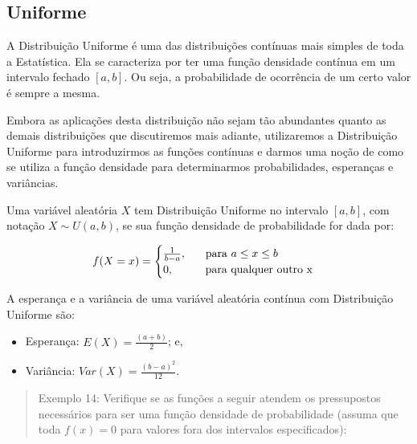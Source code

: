 \documentclass[
]{book}
\providecommand{\tightlist}{%
  \setlength{\itemsep}{0pt}\setlength{\parskip}{0pt}}
\begin{document}
\hypertarget{uniforme}{%
\subsection{Uniforme}\label{uniforme}}

\hfill\break

A Distribuição Uniforme é uma das distribuições contínuas mais simples de toda a Estatística. Ela se caracteriza por ter uma função densidade contínua em um intervalo fechado \([a,b]\). Ou seja, a probabilidade de ocorrência de um certo valor é sempre a mesma.

\hfill\break

Embora as aplicações desta distribuição não sejam tão abundantes quanto as demais distribuições que discutiremos mais adiante, utilizaremos a Distribuição Uniforme para introduzirmos as funções contínuas e darmos uma noção de como se utiliza a função densidade para determinarmos probabilidades, esperanças e variâncias.

\hfill\break

Uma variável aleatória \(X\) tem Distribuição Uniforme no intervalo \([a,b]\), com notação \(X \sim U (a, b)\), se sua função densidade de probabilidade for dada por:

\hfill\break

\[
f(X=x)=
\begin{cases}
    \frac{1}{b-a}, \hspace{0.6cm} \text{para } a \le x \le b \\
    0, \hspace{1cm} \text{para qualquer outro x}\\
\end{cases}
\]

\hfill\break

A esperança e a variância de uma variável aleatória contínua com Distribuição Uniforme são:

\begin{itemize}
\tightlist
\item
  Esperança: \(E(X) = \frac{(a+b)}{2}\); e,
\item
  Variância: \(Var(X) = \frac{(b-a)^{2} }{12}\).
\end{itemize}

\hfill\break

\begin{quote}
Exemplo 14: Verifique se as funções a seguir atendem os pressupostos necessários para ser uma função densidade de probabilidade (assuma que toda \(f(x)=0\) para valores fora dos intervalos especificados):
\end{quote}
\end{document}
